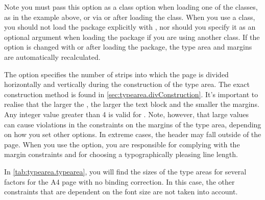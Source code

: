 Note you must pass this option as a class option when
loading one of the {\KOMAScript} classes, as in the example above, or via
 or 
after loading the class. When you use a {\KOMAScript} class, you should not
load the  package explicitly with
, nor should you specify it as an optional
argument when loading the package if you are using another class. If the
option is changed with  or
 after loading the package, the type area
and margins are automatically recalculated.%
%
\EndIndexGroup


\begin{Declaration}
\end{Declaration}%
The  option
specifies the number of strips into which the page is divided horizontally and
vertically during the construction of the type area. The exact construction
method is found in \autoref{sec:typearea.divConstruction}. It's important to
realise that the larger the , the larger the text block and the
smaller the margins. Any integer value greater than 4 is valid for
. Note, however, that large values can cause violations in the
constraints on the margins of the type area, depending on how you set other
options. In extreme cases, the header may fall outside of the page. When you
use the  option, you are responsible for complying
with the margin constraints and for choosing a typographically pleasing line
length.

In \autoref{tab:typearea.typearea}, you will find the sizes of the type areas
for several  factors for the A4 page with no binding correction. In
this case, the other constraints that are dependent on the font size are not
taken into account.

